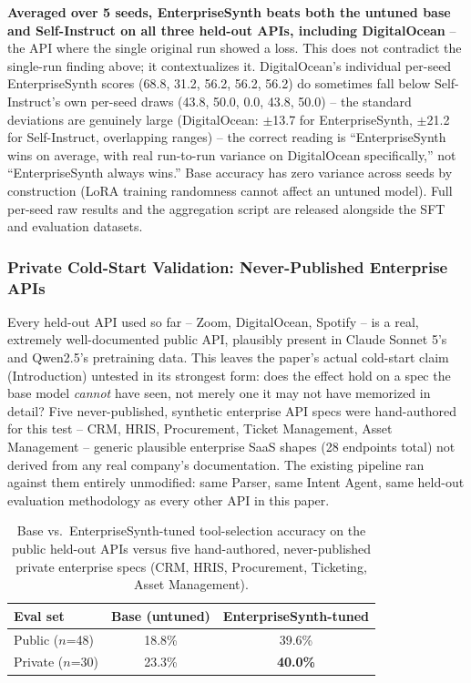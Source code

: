 \documentclass[letterpaper]{article} %
\begin{document}
\textbf{Averaged over 5 seeds, EnterpriseSynth beats both the untuned base and Self-Instruct on
all three held-out APIs, including DigitalOcean} -- the API where the single original run showed a
loss. This does not contradict the single-run finding above; it contextualizes it. DigitalOcean's
individual per-seed EnterpriseSynth scores (68.8, 31.2, 56.2, 56.2, 56.2) do sometimes fall below
Self-Instruct's own per-seed draws (43.8, 50.0, 0.0, 43.8, 50.0) -- the standard deviations are
genuinely large (DigitalOcean: $\pm$13.7 for EnterpriseSynth, $\pm$21.2 for Self-Instruct,
overlapping ranges) -- the correct reading is ``EnterpriseSynth wins on average, with real
run-to-run variance on DigitalOcean specifically,'' not ``EnterpriseSynth always wins.'' Base
accuracy has zero variance across seeds by construction (LoRA training randomness cannot affect an
untuned model). Full per-seed raw results and the aggregation script are released alongside the
SFT and evaluation datasets.

\subsubsection{Private Cold-Start Validation: Never-Published Enterprise APIs}
Every held-out API used so far -- Zoom, DigitalOcean, Spotify -- is a real, extremely
well-documented public API, plausibly present in Claude Sonnet 5's and Qwen2.5's pretraining
data. This leaves the paper's actual cold-start claim (Introduction) untested in its strongest form:
does the effect hold on a spec the base model \textit{cannot} have seen, not merely one it may not
have memorized in detail? Five never-published, synthetic enterprise API specs were hand-authored
for this test -- CRM, HRIS, Procurement, Ticket Management, Asset Management -- generic plausible
enterprise SaaS shapes (28 endpoints total) not derived from any real company's documentation. The
existing pipeline ran against them entirely unmodified: same Parser, same Intent Agent, same
held-out evaluation methodology as every other API in this paper.

\begin{table}[htbp]
\centering
\footnotesize
\setlength{\tabcolsep}{2pt}
\caption{Base vs.\ EnterpriseSynth-tuned tool-selection accuracy on the public held-out APIs
versus five hand-authored, never-published private enterprise specs (CRM, HRIS, Procurement,
Ticketing, Asset Management).}
\label{tab:coldstart-private}
\begin{tabular}{lcc}
\toprule
\textbf{Eval set} & \textbf{Base (untuned)} & \textbf{EnterpriseSynth-tuned} \\
\midrule
Public ($n$=48) & 18.8\% & 39.6\% \\
Private ($n$=30) & 23.3\% & \textbf{40.0\%} \\
\bottomrule
\end{tabular}
\end{table}
\end{document}
